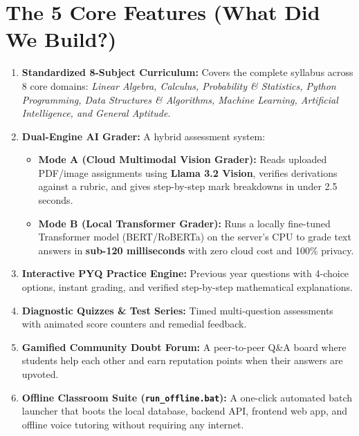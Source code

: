 \documentclass[11pt,a4paper]{article}
\begin{document}
\section{The 5 Core Features (What Did We Build?)}
\begin{enumerate}[leftmargin=*]
    \item \textbf{Standardized 8-Subject Curriculum:} Covers the complete syllabus across 8 core domains: \textit{Linear Algebra, Calculus, Probability \& Statistics, Python Programming, Data Structures \& Algorithms, Machine Learning, Artificial Intelligence, and General Aptitude}.
    \item \textbf{Dual-Engine AI Grader:} A hybrid assessment system:
    \begin{itemize}
        \item \textbf{Mode A (Cloud Multimodal Vision Grader):} Reads uploaded PDF/image assignments using \textbf{Llama 3.2 Vision}, verifies derivations against a rubric, and gives step-by-step mark breakdowns in under 2.5 seconds.
        \item \textbf{Mode B (Local Transformer Grader):} Runs a locally fine-tuned Transformer model (BERT/RoBERTa) on the server's CPU to grade text answers in \textbf{sub-120 milliseconds} with zero cloud cost and 100\% privacy.
    \end{itemize}
    \item \textbf{Interactive PYQ Practice Engine:} Previous year questions with 4-choice options, instant grading, and verified step-by-step mathematical explanations.
    \item \textbf{Diagnostic Quizzes \& Test Series:} Timed multi-question assessments with animated score counters and remedial feedback.
    \item \textbf{Gamified Community Doubt Forum:} A peer-to-peer Q\&A board where students help each other and earn reputation points when their answers are upvoted.
    \item \textbf{Offline Classroom Suite (\texttt{run\_offline.bat}):} A one-click automated batch launcher that boots the local database, backend API, frontend web app, and offline voice tutoring without requiring any internet.
\end{enumerate}

\end{document}
